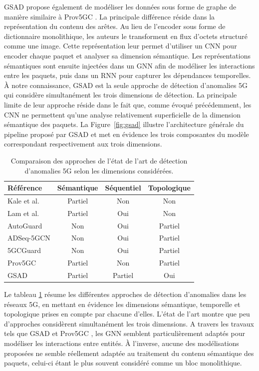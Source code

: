 \documentclass[a4paper,11pt,twoside]{StyleThese}
\begin{document}
GSAD \cite{gsad} propose également de modéliser les données sous forme de graphe de manière similaire à Prov5GC \cite{prov5g}. La principale différence réside dans la représentation du contenu des arêtes. Au lieu de l’encoder sous forme de dictionnaire monolithique, les auteurs le transforment en flux d’octets structuré comme une image. Cette représentation leur permet d’utiliser un CNN pour encoder chaque paquet et analyser sa dimension sémantique. Les représentations sémantiques sont ensuite injectées dans un GNN afin de modéliser les interactions entre les paquets, puis dans un RNN pour capturer les dépendances temporelles. À notre connaissance, GSAD \cite{gsad} est la seule approche de détection d’anomalies 5G qui considère simultanément les trois dimensions de détection. La principale limite de leur approche réside dans le fait que, comme évoqué précédemment, les CNN ne permettent qu’une analyse relativement superficielle de la dimension sémantique des paquets. La Figure~\ref{fig:gsad} illustre l’architecture générale du pipeline proposé par GSAD et met en évidence les trois composantes du modèle correspondant respectivement aux trois dimensions.


\begin{table}[h]
\centering
\begin{tabular}{lccc}
\hline
\textbf{Référence} & \textbf{Sémantique} & \textbf{Séquentiel} & \textbf{Topologique} \\
\hline
Kale et al. \cite{ensemble}         & Partiel  & Non      & Non \\
Lam et al. \cite{cnn}               & Partiel  & Oui      & Non \\
AutoGuard \cite{autoguard}          & Non      & Oui      & Partiel \\
ADSeq-5GCN \cite{adseq}             & Non      & Oui      & Partiel \\
5GCGuard \cite{5GCGuard}            & Non      & Oui      & Partiel \\
Prov5GC \cite{prov5g}               & Partiel  & Non      & Partiel \\
GSAD \cite{gsad}                    & Partiel  & Partiel  & Oui \\
\hline
\end{tabular}
\caption{Comparaison des approches de l'état de l'art de détection d'anomalies 5G selon les dimensions considérées.}
\label{tab:sota_comparison}
\end{table}

Le tableau \ref{tab:sota_comparison} résume les différentes approches de détection d’anomalies dans les réseaux 5G, en mettant en évidence les dimensions sémantique, temporelle et topologique prises en compte par chacune d’elles. L’état de l’art montre que peu d’approches considèrent simultanément les trois dimensions. A travers les travaux tels que GSAD \cite{gsad} et Prov5GC \cite{prov5g}, les GNN semblent particulièrement adaptés pour modéliser les interactions entre entités. À l’inverse, aucune des modélisations proposées ne semble réellement adaptée au traitement du contenu sémantique des paquets, celui-ci étant le plus souvent considéré comme un bloc monolithique. 
\end{document}
